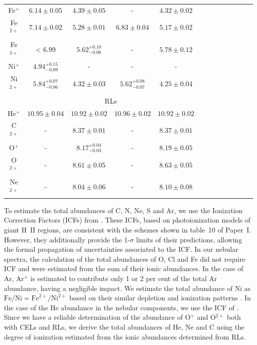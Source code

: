 \documentclass[fleqn,usenatbib]{mnras}
\begin{document}
\begin{table}
\begin{tabular}{ccccccccccccc}
Fe$^{+}$ & $6.14 \pm 0.05$ & $4.39 \pm 0.05$ & - &$4.32 \pm 0.02$\\ 

Fe$^{2+}$ & $7.14 \pm 0.02$ & $5.28 \pm 0.01$& $6.83 \pm 0.04$&$5.17 \pm 0.02$\\

Fe$^{3+}$ & < 6.99 &$5.62^{+0.10} _{-0.08}$& -&$5.78 \pm 0.12 $\\

Ni$^{+}$ & $4.94^{+0.15} _{-0.09}$ & - &-&-\\

Ni$^{2+}$ &$5.84^{+0.07} _{-0.06}$ & $4.32 \pm 0.03 $ &$5.62^{+0.08} _{-0.07}$&$4.25 \pm 0.04 $\\

 & \multicolumn{4}{c}{RLs}\\

He$^{+}$  &$10.95 \pm 0.04$  & $10.92 \pm 0.02$& $10.96 \pm 0.02$&$10.92 \pm 0.02$\\

C$^{2+}$  & -& $8.37 \pm 0.01 $ &-&  $8.37 \pm 0.01$ \\

O$^{+}$ & - & $8.17^{+0.04} _{-0.03}$& -& $8.19 \pm 0.05 $ \\

O$^{2+}$ & - & $8.61 \pm 0.05$ & - & $8.63 \pm 0.05$  \\

Ne$^{2+}$ & -&$8.04 \pm 0.06 $&-& $8.10 \pm 0.08 $ \\

\hline
\end{tabular}
\end{table}





To estimate the total abundances of C, N, Ne, S and Ar, we use the Ionization Correction Factors (ICFs) from \citet{Amayo2021}. These ICFs, based on photoionization models of giant H~II regions, are consistent with the schemes shown in table~10 of Paper~I. However, they additionally provide the 1-$\sigma$ limits of their predictions, allowing the formal propagation of uncertainties associated to the ICF. In our nebular spectra, the calculation of the total abundances of O, Cl and Fe did not require ICF and were estimated from the sum of their ionic abundances. In the case of Ar, Ar$^+$ is estimated to contribute only 1 or 2 per cent of the total Ar abundance, having a negligible impact. We estimate the total abundance of Ni as $\text{Fe/Ni}=\text{Fe}^{2+}/\text{Ni}^{2+}$ based on their similar depletion and ionization patterns \citep[][]{mendez2021-2}. In the case of the He abundance in the nebular components, we use the ICF of \citet{kunthsargent83}. Since we have a reliable determination of the abundance of O$^+$ and O$^{2+}$ both with CELs and RLs, we derive the total abundances of He, Ne and C using the degree of ionization estimated from the ionic abundances determined from RLs. 
\end{document}
